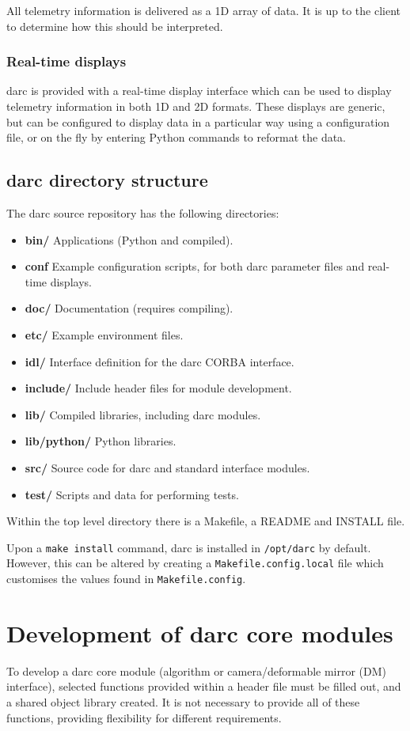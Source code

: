 \documentclass[a4,10pt]{article}
\newcommand{\dm}{deformable mirror (DM)\renewcommand{\dm}{DM\xspace}\xspace}
\begin{document}
All telemetry information is delivered as a 1D array of data.  It is
up to the client to determine how this should be interpreted.

\subsubsection{Real-time displays}
darc is provided with a real-time display interface which can be used
to display telemetry information in both 1D and 2D formats.  These
displays are generic, but can be configured to display data in a
particular way using a configuration file, or on the fly by entering
Python commands to reformat the data.

\subsection{darc directory structure}
The darc source repository has the following directories:
\begin{itemize}
\item {\bf bin/}  Applications (Python and compiled).
\item {\bf conf}  Example configuration scripts, for both darc
  parameter files and real-time displays.
\item {\bf doc/}  Documentation (requires compiling).
\item {\bf etc/}  Example environment files.
\item {\bf idl/}  Interface definition for the darc CORBA interface.
\item {\bf include/}  Include header files for module development.
\item {\bf lib/}  Compiled libraries, including darc modules.
\item {\bf lib/python/} Python libraries.
\item {\bf src/}  Source code for darc and standard interface modules.
\item {\bf test/} Scripts and data for performing tests.
\end{itemize}

Within the top level directory there is a Makefile, a README and
INSTALL file.

Upon a {\tt make install} command, darc is installed in {\tt /opt/darc} by
default.  However, this can be altered by creating a
{\tt Makefile.config.local} file which customises the values found in
{\tt Makefile.config}.


\section{Development of darc core modules}
To develop a darc core module (algorithm or camera/\dm interface),
selected functions provided within a header file must be filled out,
and a shared object library created.  It is not necessary to provide
all of these functions, providing flexibility for different requirements.
\end{document}
